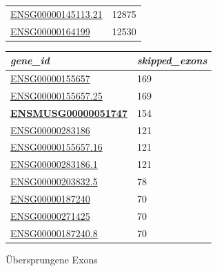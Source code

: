\documentclass[12pt]{article}
\begin{document}
\begin{figure}[htbp]
\begin{minipage}{0.45\textwidth}
\begin{tabular}{l|l}
            \href{https://asia.ensembl.org/Homo_sapiens/Gene/Summary?db=core;g=ENSG00000145113;r=3:195746765-195811973}{ENSG00000145113.21} & 12875               \\
            \href{https://asia.ensembl.org/Homo_sapiens/Gene/Summary?db=core;g=ENSG00000164199;r=5:90529344-91164437}{ENSG00000164199}    & 12530               \\
		\end{tabular}
	\end{minipage}%
	\hfill 
	\begin{minipage}{0.45\textwidth}
		\centering
		\caption{Übersprungene Exons}
		\begin{tabular}{l|l}
			\textit{\textbf{gene\_id}}                 & \textit{\textbf{skipped\_exons}} \\\hline
            \href{https://asia.ensembl.org/Homo_sapiens/Gene/Summary?db=core;g=ENSG00000155657;r=2:178525989-178830802}{ENSG00000155657}    & 169                \\
            \href{https://asia.ensembl.org/Homo_sapiens/Gene/Summary?db=core;g=ENSG00000155657;r=2:178525989-178830802}{ENSG00000155657.25} & 169                \\
            \href{https://asia.ensembl.org/Mus_musculus/Gene/Summary?db=core;g=ENSMUSG00000051747;r=2:76534324-76812891}{\textbf{ENSMUSG00000051747}} & 154                \\
            \href{https://asia.ensembl.org/Homo_sapiens/Gene/Idhistory?g=ENSG00000283186}{ENSG00000283186}    & 121                \\
            \href{https://asia.ensembl.org/Homo_sapiens/Gene/Summary?db=core;g=ENSG00000155657;r=2:178525989-178830802}{ENSG00000155657.16} & 121                \\
            \href{https://asia.ensembl.org/Homo_sapiens/Gene/Idhistory?g=ENSG00000283186}{ENSG00000283186.1}  & 121                \\
            \href{https://asia.ensembl.org/Homo_sapiens/Gene/Idhistory?g=ENSG00000203832}{ENSG00000203832.5}  & 78                 \\
            \href{https://asia.ensembl.org/Homo_sapiens/Gene/Summary?db=core;g=ENSG00000187240;r=11:103109410-103479863}{ENSG00000187240}    & 70                 \\
            \href{https://asia.ensembl.org/Homo_sapiens/Gene/Summary?db=core;g=ENSG00000271425;r=1:146064711-146229000}{ENSG00000271425}    & 70                 \\
            \href{https://asia.ensembl.org/Homo_sapiens/Gene/Summary?db=core;g=ENSG00000187240;r=11:103109410-103479863}{ENSG00000187240.8}  & 70                 \\
		\end{tabular}
	\end{minipage}
\end{figure}
\end{document}
